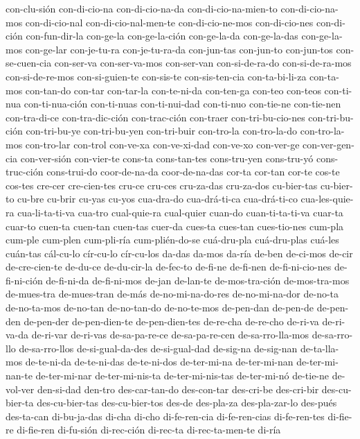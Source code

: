 {con-clu-sión con-di-cio-na con-di-cio-na-da con-di-cio-na-mien-to con-di-cio-na-mos con-di-cio-nal
con-di-cio-nal-men-te con-di-cio-ne-mos con-di-cio-nes con-di-ción con-fun-dir-la con-ge-la
con-ge-la-ción con-ge-la-da con-ge-la-das con-ge-la-mos con-ge-lar con-je-tu-ra con-je-tu-ra-da
con-jun-tas con-jun-to con-jun-tos con-se-cuen-cia con-ser-va con-ser-va-mos con-ser-van
con-si-de-ra-do con-si-de-ra-mos con-si-de-re-mos con-si-guien-te con-sis-te con-sis-ten-cia
con-ta-bi-li-za con-ta-mos con-tan-do con-tar con-tar-la con-te-ni-da con-ten-ga con-teo con-teos
con-ti-nua con-ti-nua-ción con-ti-nuas con-ti-nui-dad con-ti-nuo con-tie-ne con-tie-nen
con-tra-di-ce con-tra-dic-ción con-trac-ción con-traer con-tri-bu-cio-nes con-tri-bu-ción
con-tri-bu-ye con-tri-bu-yen con-tri-buir con-tro-la con-tro-la-do con-tro-la-mos con-tro-lar
con-trol con-ve-xa con-ve-xi-dad con-ve-xo con-ver-ge con-ver-gen-cia con-ver-sión con-vier-te
cons-ta cons-tan-tes cons-tru-yen cons-tru-yó cons-truc-ción cons-trui-do coor-de-na-da
coor-de-na-das cor-ta cor-tan cor-te cos-te cos-tes cre-cer cre-cien-tes cru-ce cru-ces cru-za-das
cru-za-dos cu-bier-tas cu-bier-to cu-bre cu-brir cu-yas cu-yos cua-dra-do cua-drá-ti-ca
cua-drá-ti-co cua-les-quie-ra cua-li-ta-ti-va cua-tro cual-quie-ra cual-quier cuan-do
cuan-ti-ta-ti-va cuar-ta cuar-to cuen-ta cuen-tan cuen-tas cuer-da cues-ta cues-tan cues-tio-nes
cum-pla cum-ple cum-plen cum-pli-ría cum-plién-do-se cuá-dru-pla cuá-dru-plas cuá-les cuán-tas
cál-cu-lo cír-cu-lo cír-cu-los da-das da-mos da-ría de-ben de-ci-mos de-cir de-cre-cien-te de-du-ce
de-du-cir-la de-fec-to de-fi-ne de-fi-nen de-fi-ni-cio-nes de-fi-ni-ción de-fi-ni-da de-fi-ni-mos
de-jan de-lan-te de-mos-tra-ción de-mos-tra-mos de-mues-tra de-mues-tran de-más de-no-mi-na-do-res
de-no-mi-na-dor de-no-ta de-no-ta-mos de-no-tan de-no-tan-do de-no-te-mos de-pen-dan de-pen-de
de-pen-den de-pen-der de-pen-dien-te de-pen-dien-tes de-re-cha de-re-cho de-ri-va de-ri-va-da
de-ri-var de-ri-vas de-sa-pa-re-ce de-sa-pa-re-cen de-sa-rro-lla-mos de-sa-rro-llo de-sa-rro-llos
de-si-gual-da-des de-si-gual-dad de-sig-na de-sig-nan de-ta-lla-mos de-te-ni-da de-te-ni-das
de-te-ni-dos de-ter-mi-na de-ter-mi-nan de-ter-mi-nan-te de-ter-mi-nar de-ter-mi-nis-ta
de-ter-mi-nis-tas de-ter-mi-nó de-tie-ne de-vol-ver den-si-dad den-tro des-car-tan-do des-con-tar
des-cri-be des-cri-bir des-cu-bier-ta des-cu-bier-tas des-cu-bier-tos des-de des-pla-za
des-pla-zar-lo des-pués des-ta-can di-bu-ja-das di-cha di-cho di-fe-ren-cia di-fe-ren-cias
di-fe-ren-tes di-fie-re di-fie-ren di-fu-sión di-rec-ción di-rec-ta di-rec-ta-men-te di-ría
}
